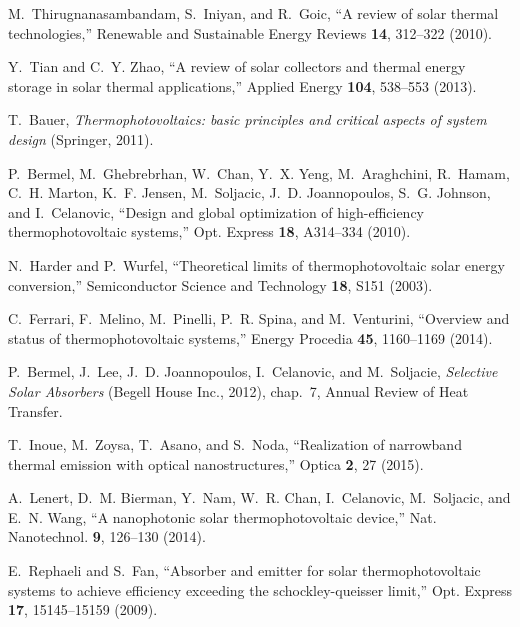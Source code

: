 \documentclass[10pt,letterpaper]{article}
\begin{document}
\providecommand{\noopsort}[1]{}\providecommand{\singleletter}[1]{#1}%
\begin{thebibliography}{100}
\newcommand{\enquote}[1]{``#1''}

M.~Thirugnanasambandam, S.~Iniyan, and R.~Goic, \enquote{A review of solar
  thermal technologies,} Renewable and Sustainable Energy Reviews \textbf{14},
  312--322 (2010).

Y.~Tian and C.~Y. Zhao, \enquote{A review of solar collectors and thermal
  energy storage in solar thermal applications,} Applied Energy \textbf{104},
  538--553 (2013).

T.~Bauer, \emph{Thermophotovoltaics: basic principles and critical aspects of
  system design} (Springer, 2011).

P.~Bermel, M.~Ghebrebrhan, W.~Chan, Y.~X. Yeng, M.~Araghchini, R.~Hamam, C.~H.
  Marton, K.~F. Jensen, M.~Soljacic, J.~D. Joannopoulos, S.~G. Johnson, and
  I.~Celanovic, \enquote{Design and global optimization of high-efficiency
  thermophotovoltaic systems,} Opt. Express \textbf{18}, A314--334 (2010).

N.~Harder and P.~Wurfel, \enquote{Theoretical limits of thermophotovoltaic
  solar energy conversion,} Semiconductor Science and Technology \textbf{18},
  S151 (2003).

C.~Ferrari, F.~Melino, M.~Pinelli, P.~R. Spina, and M.~Venturini,
  \enquote{Overview and status of thermophotovoltaic systems,} Energy Procedia
  \textbf{45}, 1160--1169 (2014).

P.~Bermel, J.~Lee, J.~D. Joannopoulos, I.~Celanovic, and M.~Soljacie,
  \emph{Selective Solar Absorbers} (Begell House Inc., 2012), chap.~7, Annual
  Review of Heat Transfer.

T.~Inoue, M.~Zoysa, T.~Asano, and S.~Noda, \enquote{Realization of narrowband
  thermal emission with optical nanostructures,} Optica \textbf{2}, 27 (2015).

A.~Lenert, D.~M. Bierman, Y.~Nam, W.~R. Chan, I.~Celanovic, M.~Soljacic, and
  E.~N. Wang, \enquote{A nanophotonic solar thermophotovoltaic device,} Nat.
  Nanotechnol. \textbf{9}, 126--130 (2014).

E.~Rephaeli and S.~Fan, \enquote{Absorber and emitter for solar
  thermophotovoltaic systems to achieve efficiency exceeding the
  schockley-queisser limit,} Opt. Express \textbf{17}, 15145--15159 (2009).


\end{thebibliography}
\end{document}
